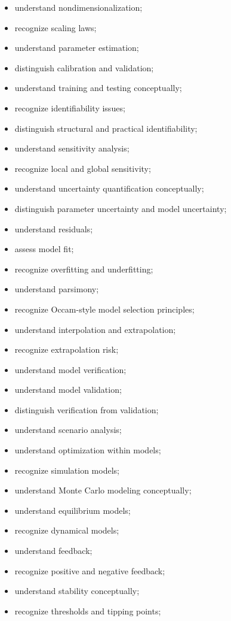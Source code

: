 {\begin{itemize}
    \item understand nondimensionalization;
    \item recognize scaling laws;
    \item understand parameter estimation;
    \item distinguish calibration and validation;
    \item understand training and testing conceptually;
    \item recognize identifiability issues;
    \item distinguish structural and practical identifiability;
    \item understand sensitivity analysis;
    \item recognize local and global sensitivity;
    \item understand uncertainty quantification conceptually;
    \item distinguish parameter uncertainty and model uncertainty;
    \item understand residuals;
    \item assess model fit;
    \item recognize overfitting and underfitting;
    \item understand parsimony;
    \item recognize Occam-style model selection principles;
    \item understand interpolation and extrapolation;
    \item recognize extrapolation risk;
    \item understand model verification;
    \item understand model validation;
    \item distinguish verification from validation;
    \item understand scenario analysis;
    \item understand optimization within models;
    \item recognize simulation models;
    \item understand Monte Carlo modeling conceptually;
    \item understand equilibrium models;
    \item recognize dynamical models;
    \item understand feedback;
    \item recognize positive and negative feedback;
    \item understand stability conceptually;
    \item recognize thresholds and tipping points;

\end{itemize}}
